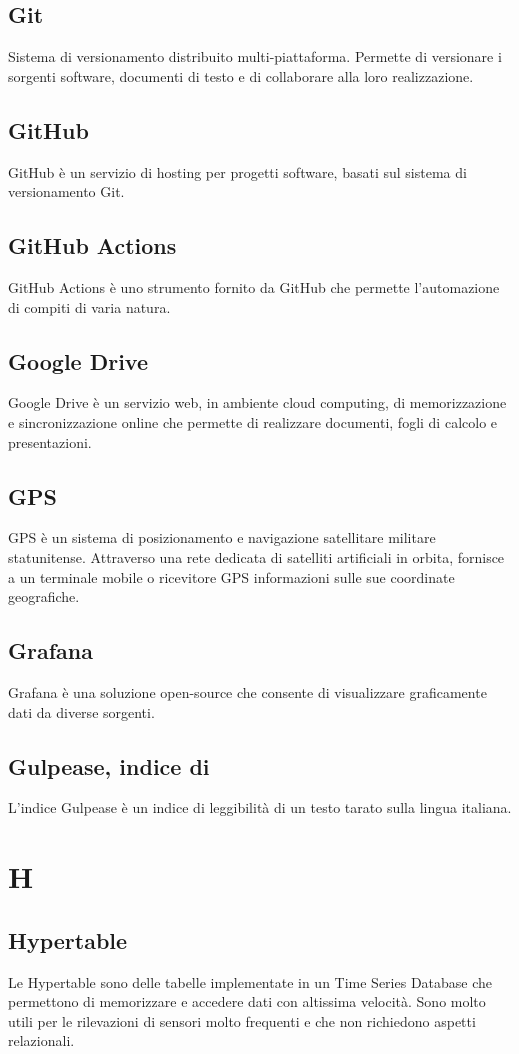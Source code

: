 \subsection{Git}  Sistema di versionamento distribuito multi-piattaforma. Permette di versionare i sorgenti software, documenti di testo e di collaborare alla loro realizzazione.
\subsection{GitHub}  GitHub è un servizio di hosting per progetti software, basati sul sistema di versionamento Git.
\subsection{GitHub Actions}  GitHub Actions è uno strumento fornito da GitHub che permette l'automazione di compiti di varia natura.
\subsection{Google Drive}  Google Drive è un servizio web, in ambiente cloud computing, di memorizzazione e sincronizzazione online che permette di realizzare documenti, fogli di calcolo e presentazioni.
\subsection{GPS}  GPS è un sistema di posizionamento e navigazione satellitare militare statunitense. Attraverso una rete dedicata di satelliti artificiali in orbita, fornisce a un terminale mobile o ricevitore GPS informazioni sulle sue coordinate geografiche.
\subsection{Grafana}  Grafana è una soluzione open-source che consente di visualizzare graficamente dati da diverse sorgenti.
\subsection{Gulpease, indice di}  L'indice Gulpease è un indice di leggibilità di un testo tarato sulla lingua italiana.


\newpage \section{H}
\subsection{Hypertable}  Le Hypertable sono delle tabelle implementate in un Time Series Database che permettono di memorizzare e accedere dati con altissima velocità. Sono molto utili per le rilevazioni di sensori molto frequenti e che non richiedono aspetti relazionali.
